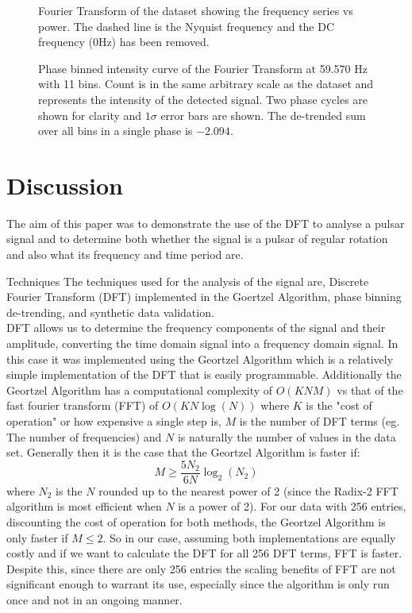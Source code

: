 \documentclass[reqno]{amsart}
\makeatletter
\renewcommand\subsection{\@startsection{subsection}{2}%
  \z@{.5\linespacing\@plus.7\linespacing}{-.5em}%
  {\normalfont\scshape\justify}}
\numberwithin{equation}{section}
\numberwithin{figure}{section}
\makeatother
\begin{document}
\begin{figure}[ht]
    \centering
    
    \caption{Fourier Transform of the dataset showing the frequency series vs power. The dashed line is the Nyquist frequency and the DC frequency (0Hz) has been removed.}
    \label{fig:ft}
\end{figure}

\begin{figure}[ht]
    \centering
    
    \caption{Phase binned intensity curve of the Fourier Transform at 59.570 Hz with 11 bins. Count is in the same arbitrary scale as the dataset and represents the intensity of the detected signal. Two phase cycles are shown for clarity and $1\sigma$ error bars are shown. The de-trended sum over all bins in a single phase is $-2.094$.}
    \label{fig:phasebins}
\end{figure}
\section{Discussion}
The aim of this paper was to demonstrate the use of the DFT to analyse a pulsar signal and to determine both whether the signal is a pulsar of regular rotation and also what its frequency and time period are.

\subsection{Techniques}
The techniques used for the analysis of the signal are, Discrete Fourier Transform (DFT) implemented in the Goertzel Algorithm, phase binning de-trending, and synthetic data validation. \\

DFT allows us to determine the frequency components of the signal and their amplitude, converting the time domain signal into a frequency domain signal. In this case it was implemented using the Geortzel Algorithm which is a relatively simple implementation of the DFT that is easily programmable. Additionally the Geortzel Algorithm has a computational complexity of $O(KNM)$ vs that of the fast fourier transform (FFT) of $O(KN\log(N))$ where $K$ is the "cost of operation" or how expensive a single step is, $M$ is the number of DFT terms (eg. The number of frequencies) and $N$ is naturally the number of values in the data set. Generally then it is the case that the Geortzel Algorithm is faster if:
\begin{equation}
    M \geq \frac{5N_2}{6N}\log_2(N_2)
    \label{eq:geortzel-vs-fft}
\end{equation}
where $N_2$ is the $N$ rounded up to the nearest power of 2 (since the Radix-2 FFT algorithm is most efficient when $N$ is a power of 2). For our data with 256 entries, discounting the cost of operation for both methods, the Geortzel Algorithm is only faster if $M \leq 2$. So in our case, assuming both implementations are equally costly and if we want to calculate the DFT for all 256 DFT terms, FFT is faster. Despite this, since there are only 256 entries the scaling benefits of FFT are not significant enough to warrant its use, especially since the algorithm is only run once and not in an ongoing manner. \\
\end{document}
